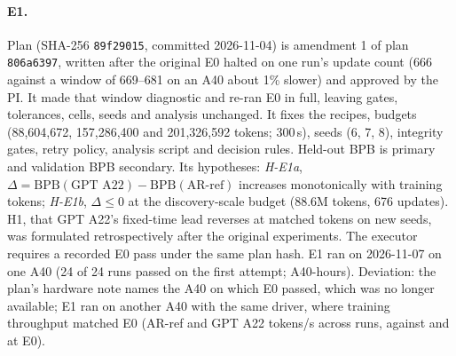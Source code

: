 \documentclass{article}
\begin{document}
\paragraph{E1.} Plan  (SHA-256 \texttt{89f29015}, committed 2026-11-04) is amendment 1 of plan \texttt{806a6397}, written after the original E0 halted on one run's update count (666 against a window of 669--681 on an A40 about 1\% slower) and approved by the PI. It made that window diagnostic and re-ran E0 in full, leaving gates, tolerances, cells, seeds and analysis unchanged. It fixes the recipes, budgets (88,604,672, 157,286,400 and 201,326,592 tokens; 300\,s), seeds (6, 7, 8), integrity gates, retry policy, analysis script and decision rules. Held-out BPB is primary and validation BPB secondary. Its hypotheses: \emph{H-E1a}, $\Delta=\mathrm{BPB}(\text{GPT A22})-\mathrm{BPB}(\text{AR-ref})$ increases monotonically with training tokens; \emph{H-E1b}, $\Delta\le0$ at the discovery-scale budget (88.6M tokens, 676 updates). H1, that GPT A22's fixed-time lead reverses at matched tokens on new seeds, was formulated retrospectively after the original experiments. The executor requires a recorded E0 pass under the same plan hash. E1 ran on 2026-11-07 on one A40 (24 of 24 runs passed on the first attempt; \CREOneHours{} A40-hours). Deviation: the plan's hardware note names the A40 on which E0 passed, which was no longer available; E1 ran on another A40 with the same driver, where training throughput matched E0 (AR-ref \CREOneTputAR{} and GPT A22 \CREOneTputAP{} tokens/s across runs, against \CREZeroTputAR{} and \CREZeroTputAP{} at E0).
\end{document}
